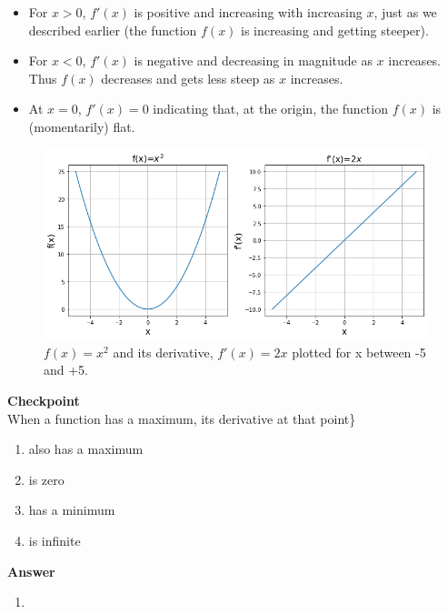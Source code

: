 \begin{itemize}
\item For $x>0$, $f'(x)$ is positive and increasing with increasing $x$, just as we described earlier (the function $f(x)$ is increasing and getting steeper).
\item For $x<0$, $f'(x)$ is negative and decreasing in magnitude as $x$ increases. Thus $f(x)$ decreases and gets less steep as $x$ increases.
\item At $x=0$, $f'(x)=0$ indicating that, at the origin, the function $f(x)$ is (momentarily) flat.
\end{itemize}

\begin{figure}[!htbp]
\centering
\includegraphics[width=0.9\linewidth]{files/ffprime-c8ca31b4706b09cd0bc7d2cab72c554a.png}
\caption[]{$f(x)=x^2$ and its derivative, $f'(x)=2x$ plotted for x between -5 and +5.}
\label{fig:Calculus:ffprime}
\end{figure}

\begin{framed}
\textbf{Checkpoint}\\
When a function has a maximum, its derivative at that point\}

\begin{enumerate}
\item also has a maximum
\item is zero
\item has a minimum
\item is infinite
\end{enumerate}

\begin{framed}
\textbf{Answer}\\
\begin{enumerate}[resume]
\item
\end{enumerate}
\end{framed}
\end{framed}

